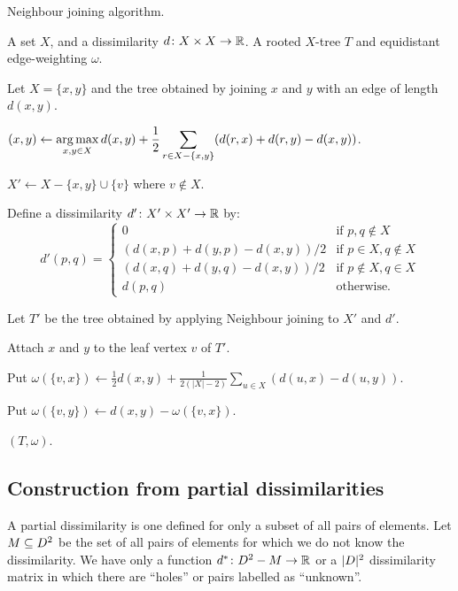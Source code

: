 \begin{algorithm}[h]
  \caption{Neighbour joining algorithm.}
  \label{alg:neighbour-joining}

  \begin{algorithmic}
    \Require A set $X$, and a dissimilarity $d \colon X \times X \to {\mathbb R}$.
    \Ensure  A rooted $X$-tree $T$ and equidistant edge-weighting $\omega$.

     Let $X = \{x,y\}$ and \Return the tree obtained by joining
    $x$ and $y$ with an edge of length $d(x,y)$.
    \EndIf

    \State $\displaystyle (x,y) \gets \operatorname*{arg\,max}_{x,y \in X} d(x,y) + \frac{1}{2}
    \sum_{r \in X - \{x,y\}} (d(r,x)+d(r,y)-d(x,y))$.

    \State $X' \gets X - \{x,y\} \cup \{v\}$ where $v \notin X$.

    \State Define a dissimilarity $d' \colon X' \times X' \to {\mathbb R}$ by:
    \begin{equation*}
      d'(p,q) =
      \begin{cases}
        0 & \text{if $p,q \notin X$} \\
        (d(x,p)+d(y,p)-d(x,y))/2 & \text{if $p \in X, q \notin X$} \\
        (d(x,q)+d(y,q)-d(x,y))/2 & \text{if $p \notin X, q \in X$} \\
        d(p,q) & \text{otherwise.}
      \end{cases}
    \end{equation*}

    \State Let $T'$ be the tree obtained by applying Neighbour joining to $X'$
    and $d'$.

    \State Attach $x$ and $y$ to the leaf vertex $v$ of $T'$.

    \State Put $\displaystyle \omega(\{v,x\}) \gets \frac{1}{2} d(x,y) +
    \frac{1}{2(|X|-2)} \sum_{u \in X} (d(u,x)-d(u,y))$.

    \State Put $\omega(\{v,y\}) \gets d(x,y) - \omega(\{v,x\})$.

    \State \Return $(T,\omega)$.
  \end{algorithmic}
\end{algorithm}

\subsection{Construction from partial dissimilarities}
\label{sec:constr-from-part}

A partial dissimilarity is one defined for only a subset of all pairs of
elements.  Let $M \subseteq D^2$ be the set of all pairs of elements for
which we do not know the dissimilarity.  We have only a function $d^* \colon
D^2 - M \to {\mathbb R}$ or a $|D|^2$ dissimilarity matrix in which there are
``holes'' or pairs labelled as ``unknown''.

